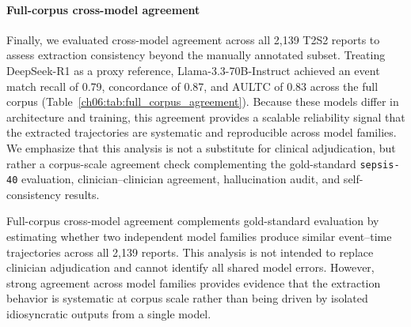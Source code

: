 \FloatBarrier
\paragraph{Full-corpus cross-model agreement}
\label{ch06:apd:full_corpus_agreement_results}
Finally, we evaluated cross-model agreement across all 2,139 T2S2 reports to assess extraction consistency beyond the manually annotated subset.
Treating DeepSeek-R1 as a proxy reference, Llama-3.3-70B-Instruct achieved an event match recall of 0.79, concordance of 0.87, and AULTC of 0.83 across the full corpus (Table~\ref{ch06:tab:full_corpus_agreement}).
Because these models differ in architecture and training, this agreement provides a scalable reliability signal that the extracted trajectories are systematic and reproducible across model families.
We emphasize that this analysis is not a substitute for clinical adjudication, but rather a corpus-scale agreement check complementing the gold-standard \texttt{sepsis-40} evaluation, clinician--clinician agreement, hallucination audit, and self-consistency results.





Full-corpus cross-model agreement complements gold-standard evaluation by estimating whether two independent model families produce similar event--time trajectories across all 2,139 reports.
This analysis is not intended to replace clinician adjudication and cannot identify all shared model errors.
However, strong agreement across model families provides evidence that the extraction behavior is systematic at corpus scale rather than being driven by isolated idiosyncratic outputs from a single model.




\FloatBarrier
